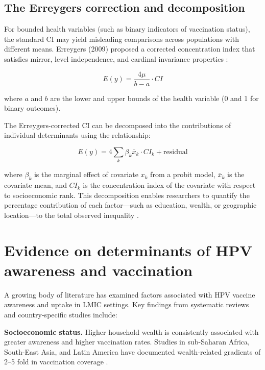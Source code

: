 \subsection{The Erreygers correction and decomposition}

For bounded health variables (such as binary indicators of vaccination status), the standard CI may yield misleading comparisons across populations with different means. Erreygers (2009) proposed a corrected concentration index that satisfies mirror, level independence, and cardinal invariance properties \cite{erreygers2009}:

\begin{equation}
E(y) = \frac{4\mu}{b-a} \cdot CI
\label{eq:erreygers}
\end{equation}

\noindent where $a$ and $b$ are the lower and upper bounds of the health variable (0 and 1 for binary outcomes).

The Erreygers-corrected CI can be decomposed into the contributions of individual determinants using the relationship:

\begin{equation}
E(y) = 4 \sum_k \beta_k \bar{x}_k \cdot CI_k + \text{residual}
\label{eq:decomposition}
\end{equation}

\noindent where $\beta_k$ is the marginal effect of covariate $x_k$ from a probit model, $\bar{x}_k$ is the covariate mean, and $CI_k$ is the concentration index of the covariate with respect to socioeconomic rank. This decomposition enables researchers to quantify the percentage contribution of each factor---such as education, wealth, or geographic location---to the total observed inequality \cite{wagstaff2003,hosseinpoor2012}.

\section{Evidence on determinants of HPV awareness and vaccination}

A growing body of literature has examined factors associated with HPV vaccine awareness and uptake in LMIC settings. Key findings from systematic reviews and country-specific studies include:

\textbf{Socioeconomic status.} Higher household wealth is consistently associated with greater awareness and higher vaccination rates. Studies in sub-Saharan Africa, South-East Asia, and Latin America have documented wealth-related gradients of 2--5 fold in vaccination coverage \cite{paul2020,simo2020}.

